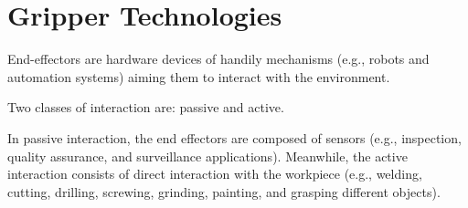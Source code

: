 \section{Gripper Technologies}
\label{sec:grippers_technolgy}

End-effectors are hardware devices of handily mechanisms (e.g., robots and automation
systems) aiming them to interact with the environment.

Two classes of interaction are: passive and active.

In passive interaction, the end effectors are composed of sensors (e.g., inspection, quality assurance, and surveillance applications). Meanwhile, the active interaction consists of direct interaction with the workpiece (e.g., welding, cutting, drilling, screwing, grinding, painting, and grasping different objects).

\begin{figure}[h!]
\end{figure}

